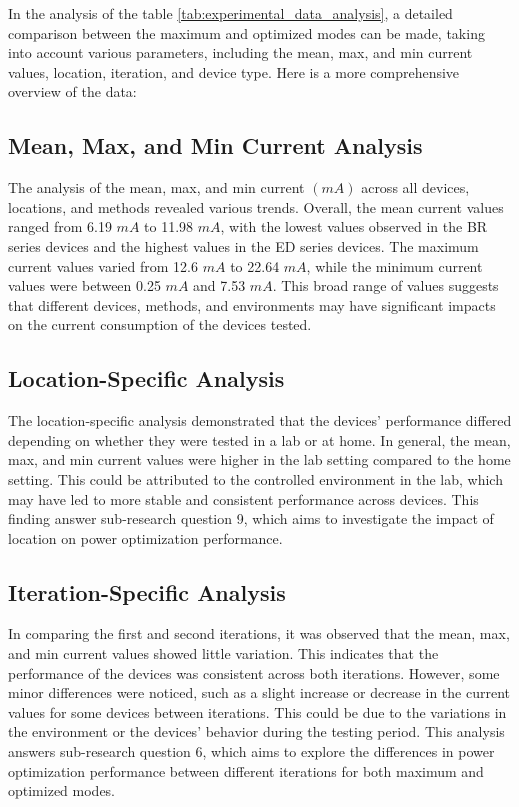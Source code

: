 In the analysis of the table \ref{tab:experimental_data_analysis}, a detailed comparison between the maximum and optimized modes can be made, taking into account various parameters, including the mean, max, and min current values, location, iteration, and device type. Here is a more comprehensive overview of the data:


\subsection{Mean, Max, and Min Current Analysis}

The analysis of the mean, max, and min current $(mA)$ across all devices, locations, and methods revealed various trends. Overall, the mean current values ranged from 6.19 $mA$ to 11.98 $mA$, with the lowest values observed in the BR series devices and the highest values in the ED series devices. The maximum current values varied from 12.6 $mA$ to 22.64 $mA$, while the minimum current values were between 0.25 $mA$ and 7.53 $mA$. This broad range of values suggests that different devices, methods, and environments may have significant impacts on the current consumption of the devices tested.


\subsection{Location-Specific Analysis}

The location-specific analysis demonstrated that the devices' performance differed depending on whether they were tested in a lab or at home. In general, the mean, max, and min current values were higher in the lab setting compared to the home setting. This could be attributed to the controlled environment in the lab, which may have led to more stable and consistent performance across devices. This finding answer sub-research question 9, which aims to investigate the impact of location on power optimization performance.


\subsection{Iteration-Specific Analysis}

In comparing the first and second iterations, it was observed that the mean, max, and min current values showed little variation. This indicates that the performance of the devices was consistent across both iterations. However, some minor differences were noticed, such as a slight increase or decrease in the current values for some devices between iterations. This could be due to the variations in the environment or the devices' behavior during the testing period. This analysis answers sub-research question 6, which aims to explore the differences in power optimization performance between different iterations for both maximum and optimized modes.


